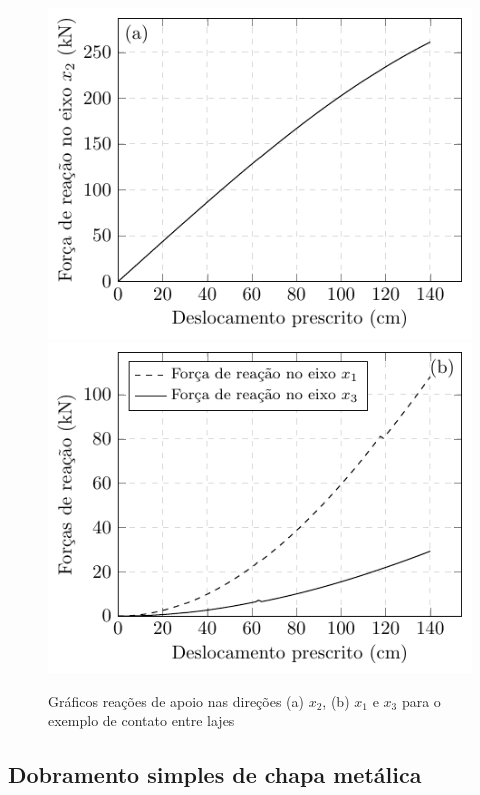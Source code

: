 \documentclass[Tese.tex]{subfiles}
\begin{document}
\begin{figure}[!htb]
	\centering
	\caption{Gráficos reações de apoio nas direções (a) $x_2$, (b) $x_1$ e $x_3$ para o exemplo de contato entre lajes}
	\label{fig:ExemplosContatoSlabReactions}
	\includegraphics[scale=1.0]{Figuras/ExemplosContato/ContactSlabReactionY.pdf}\;\;\includegraphics[scale=1.0]{Figuras/ExemplosContato/ContactSlabReactions.pdf}	
\end{figure}

\subsection{Dobramento simples de chapa metálica}\label{subsec:simple-bending}
\end{document}
